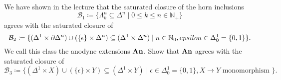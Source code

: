 \begin{Exercise}
    
We have shown in the lecture that the saturated closure of the horn inclusions 
\[
    \mathcal{B}_1 
    \coloneqq 
    \{ \Lambda_k^n \subseteq \Delta^n \mid 0 \leq k \leq n \in \mathbb{ N }_+ \}
\]
agrees with the saturated closure of
\[
    \mathcal{B}_2
    \coloneqq
    \{ ( \Delta^1 \times \partial\Delta^n) \cup ( \{ \epsilon \} \times \Delta^n ) \subseteq ( \Delta^1 \times \Delta^n ) \mid n \in \mathbb{ N }_0 , \\epsilon \in \Delta_0^1 = \{ 0 , 1 \} \}.
\]
We call this class the anodyne extensions $ \bold{ An }$.
Show that $ \bold{ An } $ agrees with the saturated closure of 
\[
    \mathcal{ B }_3 
    \coloneqq
    \{ ( \Delta^1 \times X ) \cup ( \{ \epsilon \} \times Y ) \subseteq ( \Delta^1 \times Y ) \mid  \epsilon \in \Delta_0^1 = \{ 0 , 1 \} , X \to Y \text{ monomorphism } \}.
\]

\end{Exercise}




    